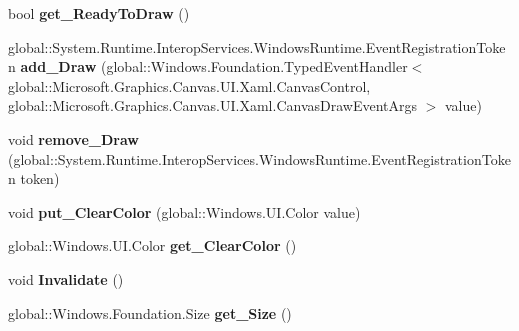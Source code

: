 \begin{DoxyCompactItemize}
bool {\bfseries get\+\_\+\+Ready\+To\+Draw} ()
\item 
\mbox{\label{interface_microsoft_1_1_graphics_1_1_canvas_1_1_u_i_1_1_xaml_1_1_i_canvas_control_aab6814607ac46d5dfa2fdff6dbb0fa3c}} 
global\+::\+System.\+Runtime.\+Interop\+Services.\+Windows\+Runtime.\+Event\+Registration\+Token {\bfseries add\+\_\+\+Draw} (global\+::\+Windows.\+Foundation.\+Typed\+Event\+Handler$<$ global\+::\+Microsoft.\+Graphics.\+Canvas.\+U\+I.\+Xaml.\+Canvas\+Control, global\+::\+Microsoft.\+Graphics.\+Canvas.\+U\+I.\+Xaml.\+Canvas\+Draw\+Event\+Args $>$ value)
\item 
\mbox{\label{interface_microsoft_1_1_graphics_1_1_canvas_1_1_u_i_1_1_xaml_1_1_i_canvas_control_a7d03879a3626825631ff4dd027e13037}} 
void {\bfseries remove\+\_\+\+Draw} (global\+::\+System.\+Runtime.\+Interop\+Services.\+Windows\+Runtime.\+Event\+Registration\+Token token)
\item 
\mbox{\label{interface_microsoft_1_1_graphics_1_1_canvas_1_1_u_i_1_1_xaml_1_1_i_canvas_control_a9b6277e93cd22ec62980077d6054abfa}} 
void {\bfseries put\+\_\+\+Clear\+Color} (global\+::\+Windows.\+U\+I.\+Color value)
\item 
\mbox{\label{interface_microsoft_1_1_graphics_1_1_canvas_1_1_u_i_1_1_xaml_1_1_i_canvas_control_a07569bdb3de20d484ad960b033c65d6d}} 
global\+::\+Windows.\+U\+I.\+Color {\bfseries get\+\_\+\+Clear\+Color} ()
\item 
\mbox{\label{interface_microsoft_1_1_graphics_1_1_canvas_1_1_u_i_1_1_xaml_1_1_i_canvas_control_a58180969617e4c94aa46ad9763ecfbd8}} 
void {\bfseries Invalidate} ()
\item 
\mbox{\label{interface_microsoft_1_1_graphics_1_1_canvas_1_1_u_i_1_1_xaml_1_1_i_canvas_control_a46bc807db80b81ae48b03fe7fd9ef0fc}} 
global\+::\+Windows.\+Foundation.\+Size {\bfseries get\+\_\+\+Size} ()

\end{DoxyCompactItemize}
